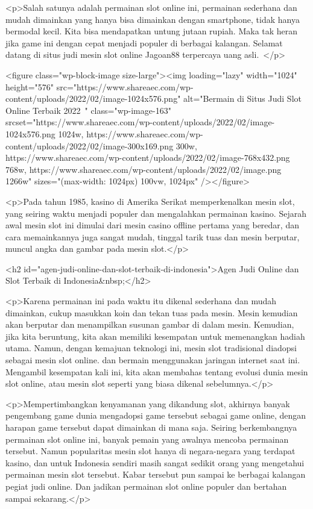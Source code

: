 {<p>Salah satunya adalah permainan slot online ini, permainan sederhana dan mudah dimainkan yang hanya bisa dimainkan dengan smartphone, tidak hanya bermodal kecil. Kita bisa mendapatkan untung jutaan rupiah. Maka tak heran jika game ini dengan cepat menjadi populer di berbagai kalangan. Selamat datang di situs judi mesin slot online Jagoan88 terpercaya uang asli. </p>



<figure class="wp-block-image size-large"><img loading="lazy" width="1024" height="576" src="https://www.shareaec.com/wp-content/uploads/2022/02/image-1024x576.png" alt="Bermain di Situs Judi Slot Online Terbaik 2022 " class="wp-image-163" srcset="https://www.shareaec.com/wp-content/uploads/2022/02/image-1024x576.png 1024w, https://www.shareaec.com/wp-content/uploads/2022/02/image-300x169.png 300w, https://www.shareaec.com/wp-content/uploads/2022/02/image-768x432.png 768w, https://www.shareaec.com/wp-content/uploads/2022/02/image.png 1266w" sizes="(max-width: 1024px) 100vw, 1024px" /></figure>



<p>Pada tahun 1985, kasino di Amerika Serikat memperkenalkan mesin slot, yang seiring waktu menjadi populer dan mengalahkan permainan kasino. Sejarah awal mesin slot ini dimulai dari mesin casino offline pertama yang beredar, dan cara memainkannya juga sangat mudah, tinggal tarik tuas dan mesin berputar, muncul angka dan gambar pada mesin slot.</p>



<h2 id="agen-judi-online-dan-slot-terbaik-di-indonesia">Agen Judi Online dan Slot Terbaik di Indonesia&nbsp;</h2>



<p>Karena permainan ini pada waktu itu dikenal sederhana dan mudah dimainkan, cukup masukkan koin dan tekan tuas pada mesin. Mesin kemudian akan berputar dan menampilkan susunan gambar di dalam mesin. Kemudian, jika kita beruntung, kita akan memiliki kesempatan untuk memenangkan hadiah utama. Namun, dengan kemajuan teknologi ini, mesin slot tradisional diadopsi sebagai mesin slot online. dan bermain menggunakan jaringan internet saat ini. Mengambil kesempatan kali ini, kita akan membahas tentang evolusi dunia mesin slot online, atau mesin slot seperti yang biasa dikenal sebelumnya.</p>



<p>Mempertimbangkan kenyamanan yang dikandung slot, akhirnya banyak pengembang game dunia mengadopsi game tersebut sebagai game online, dengan harapan game tersebut dapat dimainkan di mana saja. Seiring berkembangnya permainan slot online ini, banyak pemain yang awalnya mencoba permainan tersebut. Namun popularitas mesin slot hanya di negara-negara yang terdapat kasino, dan untuk Indonesia sendiri masih sangat sedikit orang yang mengetahui permainan mesin slot tersebut. Kabar tersebut pun sampai ke berbagai kalangan pegiat judi online. Dan jadikan permainan slot online populer dan bertahan sampai sekarang.</p>



}
